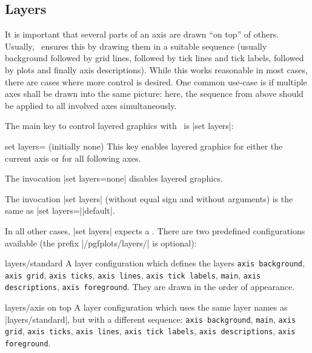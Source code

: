 \subsection{Layers}
{
%

It is important that several parts of an axis are drawn ``on top'' of others. Usually, \PGFPlots\ ensures this by drawing them in a suitable sequence (usually background followed by grid lines, followed by tick lines and tick labels, followed by plots and finally axis descriptions). While this works reasonable in most cases, there are cases where more control is desired. One common use-case is if multiple axes shall be drawn into the same picture: here, the sequence from above should be applied to all involved axes simultaneously. 

The main key to control layered graphics with \PGFPlots\ is |set layers|:


\begin{pgfplotskey}{set layers= (initially none)}
   This key enables layered graphics for either the current axis or for all following axes. 

   The invocation |set layers=none| disables layered graphics.

   The invocation |set layers| (without equal sign and without arguments) is the same as |set layers=||default|.

   In all other cases, |set layers| expects a . There are two predefined configurations available (the prefix |/pgfplots/layers/| is optional):

   \begin{pgfplotskey}{layers/standard}
   	A layer configuration which defines the layers \texttt{axis background}, \texttt{axis grid}, \texttt{axis ticks}, \texttt{axis lines}, \texttt{axis tick labels}, \texttt{main}, \texttt{axis descriptions}, \texttt{axis foreground}. They are drawn in the order of appearance.
   \end{pgfplotskey}

   \begin{pgfplotskey}{layers/axis on top}
   	A layer configuration which uses the same layer names as |layers/standard|, but with a different sequence: \texttt{axis background}, \texttt{main}, \texttt{axis grid}, \texttt{axis ticks}, \texttt{axis lines}, \texttt{axis tick labels}, \texttt{axis descriptions}, \texttt{axis foreground}.


\end{pgfplotskey}
\end{pgfplotskey}}
